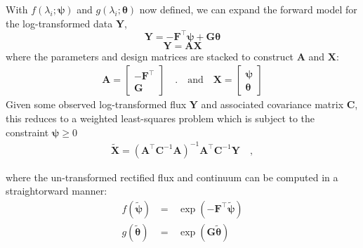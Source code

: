 \documentclass[modern]{aastex631}
\renewcommand{\vec}[1]{\mathbf{#1}}
\newcommand{\vectheta}{\boldsymbol{\theta}}
\newcommand{\vecpsi}{\boldsymbol{\psi}}
\newcommand{\vecH}{\mathbf{H}}
\newcommand{\transpose}{^\top}
\begin{document}
\noindent{}With $f(\lambda_i;\vecpsi)$ and $g(\lambda_i;\vectheta)$ now defined, we can expand the forward model for the log-transformed data $\vec{Y}$,
\begin{equation}
    \vec{Y} = -\vec{F}\transpose\vecpsi + \vec{G}\vectheta
\end{equation}
\begin{equation}
    \vec{Y} = \vec{A}\vec{X}
\end{equation}
where the parameters and design matrices are stacked to construct $\vec{A}$ and $\vec{X}$:
\begin{eqnarray}
    \vec{A} = \begin{bmatrix}-\vec{F}\transpose\\\vec{G}\end{bmatrix} \quad .
    \quad \mbox{and} \quad 
    \vec{X} = \begin{bmatrix}\vecpsi\\\vectheta\end{bmatrix} 
\end{eqnarray}
Given some observed log-transformed flux $\vec{Y}$ and associated covariance matrix $\vec{C}$, this reduces to a weighted least-squares problem which is subject to the constraint $\vecpsi \geq 0$
\begin{eqnarray}
    \vec{\tilde{X}} = (\vec{A}\transpose\vec{C}^{-1}\vec{A})^{-1}\vec{A}\transpose\vec{C}^{-1}\vec{Y} \quad ,
\end{eqnarray}

\noindent{}where the un-transformed rectified flux and continuum can be computed in a straightorward manner:
\begin{eqnarray}
    f(\boldsymbol{\tilde{\psi}}) &\,=\,& \exp{\left(-\vec{F}\transpose\boldsymbol{\tilde{\psi}}\right)} \\
    g(\boldsymbol{\tilde{\theta}}) &\,=\,& \exp{\left(\vec{G}\boldsymbol{\tilde{\theta}}\right)}
\end{eqnarray}




\end{document}
